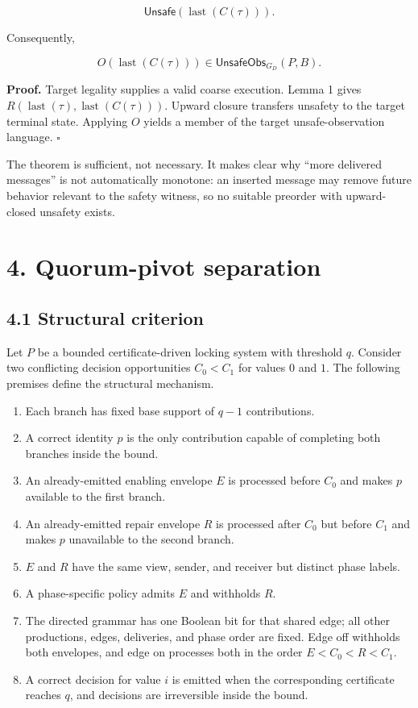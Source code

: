 \documentclass[10pt,a4paper]{article}
\newcommand{\tightlist}{\setlength{\itemsep}{0pt}\setlength{\parskip}{0pt}}
\begin{document}
\[
\mathsf{Unsafe}(\operatorname{last}(C(\tau))).
\]

Consequently,

\[
O(\operatorname{last}(C(\tau)))
\in \mathsf{UnsafeObs}_{G_D}(P,B).
\]

\textbf{Proof.} Target legality supplies a valid coarse execution. Lemma
1 gives \(R(\operatorname{last}(\tau),\operatorname{last}(C(\tau)))\).
Upward closure transfers unsafety to the target terminal state. Applying
\(O\) yields a member of the target unsafe-observation language.
\(\square\)

The theorem is sufficient, not necessary. It makes clear why ``more
delivered messages'' is not automatically monotone: an inserted message
may remove future behavior relevant to the safety witness, so no
suitable preorder with upward-closed unsafety exists.

\section{4. Quorum-pivot separation}\label{quorum-pivot-separation}

\subsection{4.1 Structural criterion}\label{structural-criterion}

Let \(P\) be a bounded certificate-driven locking system with threshold
\(q\). Consider two conflicting decision opportunities \(C_0<C_1\) for
values \(0\) and \(1\). The following premises define the structural
mechanism.

\begin{enumerate}
\def\labelenumi{\arabic{enumi}.}
\tightlist
\item
  Each branch has fixed base support of \(q-1\) contributions.
\item
  A correct identity \(p\) is the only contribution capable of
  completing both branches inside the bound.
\item
  An already-emitted enabling envelope \(E\) is processed before \(C_0\)
  and makes \(p\) available to the first branch.
\item
  An already-emitted repair envelope \(R\) is processed after \(C_0\)
  but before \(C_1\) and makes \(p\) unavailable to the second branch.
\item
  \(E\) and \(R\) have the same view, sender, and receiver but distinct
  phase labels.
\item
  A phase-specific policy admits \(E\) and withholds \(R\).
\item
  The directed grammar has one Boolean bit for that shared edge; all
  other productions, edges, deliveries, and phase order are fixed. Edge
  off withholds both envelopes, and edge on processes both in the order
  \(E<C_0<R<C_1\).
\item
  A correct decision for value \(i\) is emitted when the corresponding
  certificate reaches \(q\), and decisions are irreversible inside the
  bound.
\end{enumerate}
\end{document}
